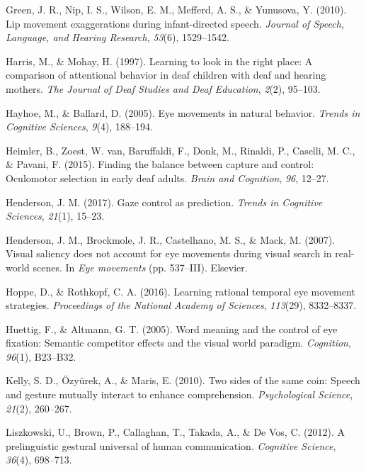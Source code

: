 \documentclass[,man,floatsintext]{apa6}
\begin{document}
\leavevmode\hypertarget{ref-green2010lip}{}%
Green, J. R., Nip, I. S., Wilson, E. M., Mefferd, A. S., \& Yunusova, Y. (2010). Lip movement exaggerations during infant-directed speech. \emph{Journal of Speech, Language, and Hearing Research}, \emph{53}(6), 1529--1542.

\leavevmode\hypertarget{ref-harris1997learning}{}%
Harris, M., \& Mohay, H. (1997). Learning to look in the right place: A comparison of attentional behavior in deaf children with deaf and hearing mothers. \emph{The Journal of Deaf Studies and Deaf Education}, \emph{2}(2), 95--103.

\leavevmode\hypertarget{ref-hayhoe2005eye}{}%
Hayhoe, M., \& Ballard, D. (2005). Eye movements in natural behavior. \emph{Trends in Cognitive Sciences}, \emph{9}(4), 188--194.

\leavevmode\hypertarget{ref-heimler2015finding}{}%
Heimler, B., Zoest, W. van, Baruffaldi, F., Donk, M., Rinaldi, P., Caselli, M. C., \& Pavani, F. (2015). Finding the balance between capture and control: Oculomotor selection in early deaf adults. \emph{Brain and Cognition}, \emph{96}, 12--27.

\leavevmode\hypertarget{ref-henderson2017gaze}{}%
Henderson, J. M. (2017). Gaze control as prediction. \emph{Trends in Cognitive Sciences}, \emph{21}(1), 15--23.

\leavevmode\hypertarget{ref-henderson2007visual}{}%
Henderson, J. M., Brockmole, J. R., Castelhano, M. S., \& Mack, M. (2007). Visual saliency does not account for eye movements during visual search in real-world scenes. In \emph{Eye movements} (pp. 537--III). Elsevier.

\leavevmode\hypertarget{ref-hoppe2016learning}{}%
Hoppe, D., \& Rothkopf, C. A. (2016). Learning rational temporal eye movement strategies. \emph{Proceedings of the National Academy of Sciences}, \emph{113}(29), 8332--8337.

\leavevmode\hypertarget{ref-huettig2005word}{}%
Huettig, F., \& Altmann, G. T. (2005). Word meaning and the control of eye fixation: Semantic competitor effects and the visual world paradigm. \emph{Cognition}, \emph{96}(1), B23--B32.

\leavevmode\hypertarget{ref-kelly2010two}{}%
Kelly, S. D., Özyürek, A., \& Maris, E. (2010). Two sides of the same coin: Speech and gesture mutually interact to enhance comprehension. \emph{Psychological Science}, \emph{21}(2), 260--267.

\leavevmode\hypertarget{ref-liszkowski2012prelinguistic}{}%
Liszkowski, U., Brown, P., Callaghan, T., Takada, A., \& De Vos, C. (2012). A prelinguistic gestural universal of human communication. \emph{Cognitive Science}, \emph{36}(4), 698--713.
\end{document}

